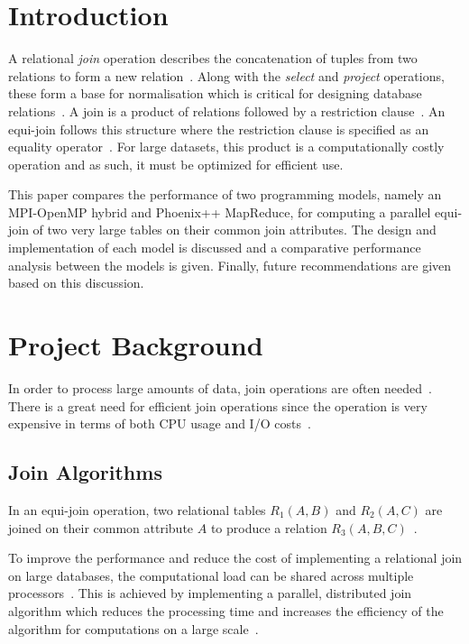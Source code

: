 \documentclass[11pt,twocolumn]{witseiepaper}
\begin{document}
\section{Introduction}

A relational \textit{join} operation describes the concatenation of tuples from two relations to form a new relation~\cite{stanczyk2001theory}. Along with the \textit{select} and \textit{project} operations, these form a base for normalisation which is critical for designing database relations~\cite{stanczyk2001theory}. A join is a product of relations followed by a restriction clause~\cite{stanczyk2001theory}. An equi-join follows this structure where the restriction clause is specified as an equality operator~\cite{stanczyk2001theory}. For large datasets, this product is a computationally costly operation and as such, it must be optimized for efficient use.

This paper compares the performance of two programming models, namely an MPI-OpenMP hybrid and Phoenix++ MapReduce, for computing a parallel equi-join of two very large tables on their common join attributes. The design and implementation of each model is discussed and a comparative performance analysis between the models is given. Finally, future recommendations are given based on this discussion.

\section{Project Background}
In order to process large amounts of data, join operations are often needed~\cite{mapReduceJoin}. There is a great need for efficient join operations since the operation is very expensive in terms of both CPU usage and I/O costs~\cite{mapReduceJoin}.

\subsection{Join Algorithms}

In an equi-join operation, two relational tables $R_1(A,B)$ and $R_2(A,C)$ are joined on their common attribute $A$ to produce a relation $R_3(A,B,C)$~\cite{thomas_zurek_optimisation_1997}.

To improve the performance and reduce the cost of implementing a relational join on large databases, the computational load can be shared across multiple processors~\cite{thomas_zurek_optimisation_1997}. This is achieved by implementing a parallel, distributed join algorithm which reduces the processing time and increases the efficiency of the algorithm for computations on a large scale~\cite{thomas_zurek_optimisation_1997}.
\end{document}
